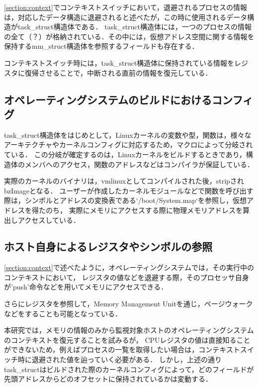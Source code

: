 \ref{section:context}でコンテキストスイッチにおいて，退避されるプロセスの情報は，対応したデータ構造に退避されると述べたが，この時に使用されるデータ構造がtask\_struct構造体である．
task\_struct構造体には，一つのプロセスの情報の全て（？）が格納されている．その中には，仮想アドレス空間に関する情報を保持するmm\_struct構造体を参照するフィールドも存在する．

コンテキストスイッチ時には，task\_struct構造体に保持されている情報をレジスタに復帰させることで，中断される直前の情報を復元している．

\subsection{オペレーティングシステムのビルドにおけるコンフィグ}

task\_struct構造体をはじめとして，Linuxカーネルの変数や型，関数は，様々なアーキテクチャやカーネルコンフィグに対応するため，マクロによって分岐されている．
この分岐が確定するのは，Linuxカーネルをビルドするときであり，構造体のメンバへのアクセス，関数のアドレスなどはコンパイラが保証している．

実際のカーネルのバイナリは，vmlinuxとしてコンパイルされた後，stripされbzImageとなる．
ユーザーが作成したカーネルモジュールなどで関数を呼び出す際は，シンボルとアドレスの変換表である`/boot/System.map`を参照し，仮想アドレスを得たのち，
実際にメモリにアクセスする際に物理メモリアドレスを算出しアクセスしている．

\subsection{ホスト自身によるレジスタやシンボルの参照}

\ref{section:context}で述べたように，オペレーティングシステムでは，その実行中のコンテキストにおいて，
レジスタの値などを退避する際，そのプロセッサ自身が'push'命令などを用いてメモリにアクセスできる．

さらにレジスタを参照して，Memory Management Unitを通じ，ページウォークなどをすることも可能となっている．

本研究では，メモリの情報のみから監視対象ホストのオペレーティングシステムのコンテキストを復元することを試みるが，
CPUレジスタの値は直接知ることができないため，例えばプロセスの一覧を取得したい場合は，コンテキストスイッチ時に退避された値を辿っていく必要がある．
しかし，上述の通りtask\_structはビルドされた際のカーネルコンフィグによって，どのフィールドが先頭アドレスからどのオフセットに保持されているかは変動する．

